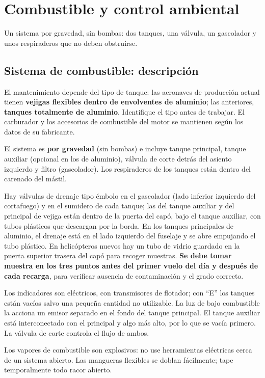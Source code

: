 \chapter{Combustible y control ambiental}
\label{cap:mm-combustible}

\opening{Un sistema por gravedad, sin bombas: dos tanques, una válvula, un gascolador y unos respiraderos que no deben obstruirse.}

\section{Sistema de combustible: descripción}

El mantenimiento depende del tipo de tanque: las aeronaves de producción actual tienen \textbf{vejigas flexibles dentro de envolventes de aluminio}; las anteriores, \textbf{tanques totalmente de aluminio}. Identifique el tipo antes de trabajar. El carburador y los accesorios de combustible del motor se mantienen según los datos de su fabricante.

El sistema es \textbf{por gravedad} (sin bombas) e incluye tanque principal, tanque auxiliar (opcional en los de aluminio), válvula de corte detrás del asiento izquierdo y filtro (gascolador). Los respiraderos de los tanques están dentro del carenado del mástil.

Hay válvulas de drenaje tipo émbolo en el gascolador (lado inferior izquierdo del cortafuego) y en el sumidero de cada tanque; las del tanque auxiliar y del principal de vejiga están dentro de la puerta del capó, bajo el tanque auxiliar, con tubos plásticos que descargan por la borda. En los tanques principales de aluminio, el drenaje está en el lado izquierdo del fuselaje y se abre empujando el tubo plástico. En helicópteros nuevos hay un tubo de vidrio guardado en la puerta superior trasera del capó para recoger muestras. \textbf{Se debe tomar muestra en los tres puntos antes del primer vuelo del día y después de cada recarga}, para verificar ausencia de contaminación y el grado correcto.

Los indicadores son eléctricos, con transmisores de flotador; con ``E'' los tanques están vacíos salvo una pequeña cantidad no utilizable. La luz de bajo combustible la acciona un emisor separado en el fondo del tanque principal. El tanque auxiliar está interconectado con el principal y algo más alto, por lo que se vacía primero. La válvula de corte controla el flujo de ambos.

\begin{advertencia}
Los vapores de combustible son explosivos: no use herramientas eléctricas cerca de un sistema abierto. Las mangueras flexibles se doblan fácilmente; tape temporalmente todo racor abierto.
\end{advertencia}

